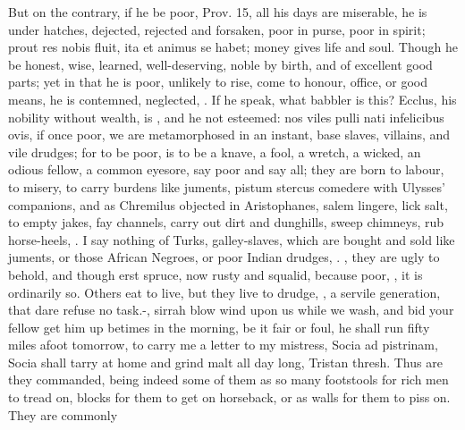 {But on the contrary, if he be poor, Prov.  15, all his days are
miserable, he is under hatches, dejected, rejected and forsaken, poor
in purse, poor in spirit; prout res nobis fluit, ita et animus se
habet; money gives life and soul. Though he be honest, wise,
learned, well-deserving, noble by birth, and of excellent good parts;
yet in that he is poor, unlikely to rise, come to honour, office, or
good means, he is contemned, neglected, . If he speak, what babbler is this?
Ecclus, his nobility without wealth, is , and
he not esteemed: nos viles pulli nati infelicibus ovis, if once poor,
we are metamorphosed in an instant, base slaves, villains, and vile
drudges; for to be poor, is to be a knave, a fool, a wretch, a
wicked, an odious fellow, a common eyesore, say poor and say all; they
are born to labour, to misery, to carry burdens like juments, pistum
stercus comedere with Ulysses' companions, and as Chremilus objected in
Aristophanes,  salem lingere, lick salt, to empty jakes, fay
channels, carry out dirt and dunghills, sweep chimneys, rub
horse-heels, \etc{}. I say nothing of Turks, galley-slaves, which are
bought and sold like juments, or those African Negroes, or poor
Indian drudges, .
, they are ugly to behold, and though erst
spruce, now rusty and squalid, because poor, , it is ordinarily so. Others eat to
live, but they live to drudge, , a servile generation, that dare refuse no
task.-, sirrah blow wind upon us while we wash, and bid your fellow
get him up betimes in the morning, be it fair or foul, he shall run
fifty miles afoot tomorrow, to carry me a letter to my mistress, Socia
ad pistrinam, Socia shall tarry at home and grind malt all day long,
Tristan thresh. Thus are they commanded, being indeed some of them as
so many footstools for rich men to tread on, blocks for them to get on
horseback, or as walls for them to piss on. They are commonly
}
